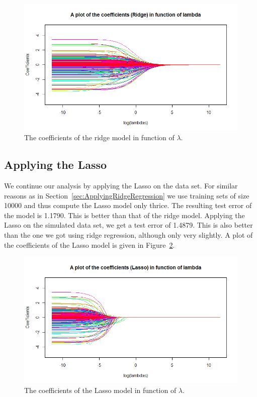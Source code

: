 \begin{figure}
    \centering
    \includegraphics[width=\linewidth]{Figures/Coeff_Lambda_plot_ridge.png}
    \caption{The coefficients of the ridge model in function of $\lambda$.}
    \label{fig:CoeffRidgeExample}
\end{figure}

\subsection{Applying the Lasso} \label{sec:ApplyingTheLasso}
We continue our analysis by applying the Lasso on the data set. For similar reasons as in Section~\ref{sec:ApplyingRidgeRegression} we use training sets of size \num{10 000} and thus compute the Lasso model only thrice. The resulting test error of the model is \num{1.1790}. This is better than that of the ridge model. Applying the Lasso on the simulated data set, we get a test error of \num{1.4879}. This is also better than the one we got using ridge regression, although only very slightly. A plot of the coefficients of the Lasso model is given in Figure~\ref{fig:CoeffLassoExample}.

\begin{figure}
    \centering
    \includegraphics[width=\linewidth]{Figures/Coeff_Lambda_plot_Lasso.png}
    \caption{The coefficients of the Lasso model in function of $\lambda$.}
    \label{fig:CoeffLassoExample}
\end{figure}

